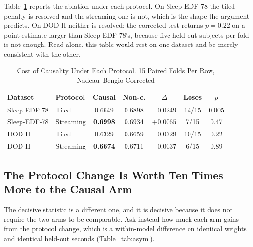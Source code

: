 \documentclass[conference]{IEEEtran}
\begin{document}
Table~\ref{tab:protocol} reports the ablation under each protocol. On Sleep-EDF-78 the tiled
penalty is resolved and the streaming one is not, which is the shape the argument predicts. On
DOD-H neither is resolved: the corrected test returns $p = 0.22$ on a point estimate larger than
Sleep-EDF-78's, because five held-out subjects per fold is not enough. Read alone, this table would
rest on one dataset and be merely consistent with the other.

\begin{table}[t]
\caption{Cost of Causality Under Each Protocol. 15 Paired Folds Per Row, Nadeau--Bengio Corrected}
\label{tab:protocol}
\centering
\footnotesize
\setlength{\tabcolsep}{4pt}
\begin{tabular}{llccccc}
\toprule
Dataset & Protocol & Causal & Non-c. & $\Delta$ & Loses & $p$ \\
\midrule
Sleep-EDF-78 & Tiled     & 0.6649 & 0.6898 & $-0.0249$ & 14/15 & 0.005 \\
Sleep-EDF-78 & Streaming & \textbf{0.6998} & 0.6934 & $\mathbf{+0.0065}$ & 7/15 & 0.47 \\
\midrule
DOD-H        & Tiled     & 0.6329 & 0.6659 & $-0.0329$ & 10/15 & 0.22 \\
DOD-H        & Streaming & \textbf{0.6674} & 0.6711 & $\mathbf{-0.0037}$ & 6/15 & 0.89 \\
\bottomrule
\end{tabular}
\end{table}

\subsection{The Protocol Change Is Worth Ten Times More to the Causal Arm}
\label{sec:asym}

The decisive statistic is a different one, and it is decisive because it does not require the two
arms to be comparable. Ask instead how much each arm gains from the protocol change, which is a
within-model difference on identical weights and identical held-out seconds
(Table~\ref{tab:asym}).
\end{document}
